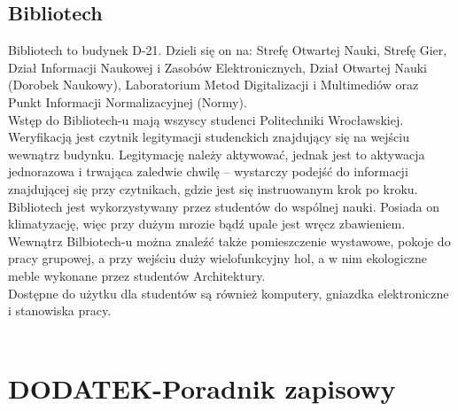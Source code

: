 \documentclass[11pt]{article}
\begin{document}
\subsection{Bibliotech}
\indent \hspace{0.5cm} Bibliotech to budynek D-21. Dzieli się on na: Strefę Otwartej Nauki, Strefę Gier, Dział Informacji Naukowej i Zasobów Elektronicznych, Dział Otwartej Nauki (Dorobek Naukowy), Laboratorium Metod Digitalizacji i Multimediów oraz Punkt Informacji Normalizacyjnej (Normy). \\
\indent Wstęp do Bibliotech-u mają wszyscy studenci Politechniki Wrocławskiej. Weryfikacją jest czytnik legitymacji studenckich znajdujący się na wejściu wewnątrz budynku. Legitymację należy aktywować, jednak jest to aktywacja jednorazowa i trwająca zaledwie chwilę – wystarczy podejść do informacji znajdującej się przy czytnikach, gdzie jest się instruowanym krok po kroku. \\
\indent Bibliotech jest wykorzystywany przez studentów do wspólnej nauki. Posiada on klimatyzację, więc przy dużym mrozie bądź upale jest wręcz zbawieniem. Wewnątrz Bilbiotech-u można znaleźć także pomieszczenie wystawowe, pokoje do pracy grupowej, a przy wejściu duży wielofunkcyjny hol, a w nim ekologiczne meble wykonane przez studentów Architektury. \\
\indent Dostępne do użytku dla studentów są również komputery, gniazdka elektroniczne i stanowiska pracy. \\\\
\begin{center}
\end{center}
\newpage
\noindent \section{DODATEK-Poradnik zapisowy}
\end{document}
